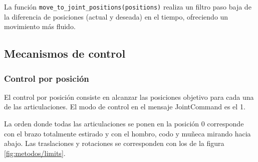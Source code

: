 La función \texttt{move\_to\_joint\_positions(positions)} realiza un filtro paso baja de la diferencia de posiciones (actual y deseada) en el tiempo, ofreciendo un movimiento más fluido.
\subsection{Mecanismos de control}
\label{subsec:metodos/control_baxter}
\subsubsection{Control por posición}
El control por posición consiste en alcanzar las posiciones objetivo para cada una de las articulaciones. El modo de control en el mensaje JointCommand es el 1.

La orden donde todas las articulaciones se ponen en la posición 0 corresponde con el brazo totalmente estirado y con el hombro, codo y muñeca mirando hacia abajo. Las traslaciones y rotaciones se corresponden con los de la figura \ref{fig:metodos/limits}.

